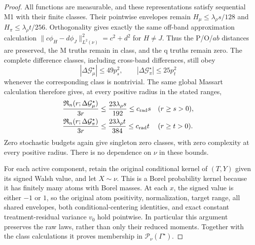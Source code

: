 \begin{proof}
All functions are measurable, and these representations satisfy sequential
M1 with their finite classes.  Their pointwise envelopes remain
\(H_\mu\le\lambda_\rho s/128\) and
\(H_\pi\le\lambda_\rho t/256\).  Orthogonality gives exactly the same
off-band approximation calculation
\(\|c\phi_H-d\phi_J\|_{L^2(\nu)}^2=c^2+d^2\) for \(H\ne J\).
Thus the P/O/\(ab\) distances are preserved, the M truths remain in
class, and the q truths remain zero.  The complete difference classes,
including cross-band differences, still obey
\[
 |\Delta\mathcal G_\mu^\star|\le49p_s^2,\qquad
 |\Delta\mathcal G_\pi^\star|\le25p_t^2
\]
whenever the corresponding class is nontrivial.  The same global Massart
calculation therefore gives, at every positive radius in the stated ranges,
\[
 \begin{aligned}
 \frac{\mathfrak R_n(r;\Delta\mathcal G_\mu^\star)}{3r}
 &\le\frac{23\lambda_\rho s}{192}\le c_{\rm rad}s
 &&(r\ge s>0),\\
 \frac{\mathfrak R_n(r;\Delta\mathcal G_\pi^\star)}{3r}
 &\le\frac{23\lambda_\rho t}{384}\le c_{\rm rad}t
 &&(r\ge t>0).
 \end{aligned}
\]
Zero stochastic budgets again give singleton zero classes, with zero
complexity at every positive radius.  There is no dependence on \(\nu\)
in these bounds.

For each active component, retain the original conditional kernel of
\((T,Y)\) given its signed Walsh value, and let \(X\sim\nu\).
This is a Borel probability kernel because it has finitely many atoms with
Borel masses.  At each \(x\), the signed value is either \(-1\) or \(1\),
so the original atom positivity, normalization, target range, all shared
envelopes, both conditional-centering identities, and exact constant
treatment-residual variance \(v_0\) hold pointwise.  In particular this
argument preserves the raw laws, rather than only their reduced moments.
Together with the class calculations it proves membership in
\(\mathcal P_\nu(\Gamma^\star)\).


\end{proof}
